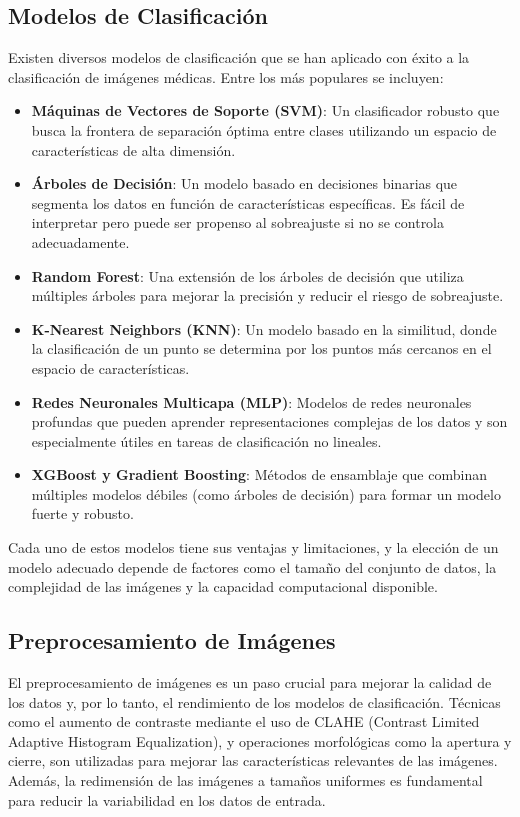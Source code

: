 \documentclass[12pt]{article}
\begin{document}
\subsection{Modelos de Clasificación}
Existen diversos modelos de clasificación que se han aplicado con éxito a la clasificación de imágenes médicas. Entre los más populares se incluyen:
\begin{itemize}
    \item \textbf{Máquinas de Vectores de Soporte (SVM)}: Un clasificador robusto que busca la frontera de separación óptima entre clases utilizando un espacio de características de alta dimensión.
    \item \textbf{Árboles de Decisión}: Un modelo basado en decisiones binarias que segmenta los datos en función de características específicas. Es fácil de interpretar pero puede ser propenso al sobreajuste si no se controla adecuadamente.
    \item \textbf{Random Forest}: Una extensión de los árboles de decisión que utiliza múltiples árboles para mejorar la precisión y reducir el riesgo de sobreajuste.
    \item \textbf{K-Nearest Neighbors (KNN)}: Un modelo basado en la similitud, donde la clasificación de un punto se determina por los puntos más cercanos en el espacio de características.
    \item \textbf{Redes Neuronales Multicapa (MLP)}: Modelos de redes neuronales profundas que pueden aprender representaciones complejas de los datos y son especialmente útiles en tareas de clasificación no lineales.
    \item \textbf{XGBoost y Gradient Boosting}: Métodos de ensamblaje que combinan múltiples modelos débiles (como árboles de decisión) para formar un modelo fuerte y robusto.
\end{itemize}

Cada uno de estos modelos tiene sus ventajas y limitaciones, y la elección de un modelo adecuado depende de factores como el tamaño del conjunto de datos, la complejidad de las imágenes y la capacidad computacional disponible.

\subsection{Preprocesamiento de Imágenes}
El preprocesamiento de imágenes es un paso crucial para mejorar la calidad de los datos y, por lo tanto, el rendimiento de los modelos de clasificación. Técnicas como el aumento de contraste mediante el uso de CLAHE (Contrast Limited Adaptive Histogram Equalization), y operaciones morfológicas como la apertura y cierre, son utilizadas para mejorar las características relevantes de las imágenes. Además, la redimensión de las imágenes a tamaños uniformes es fundamental para reducir la variabilidad en los datos de entrada.
\end{document}
